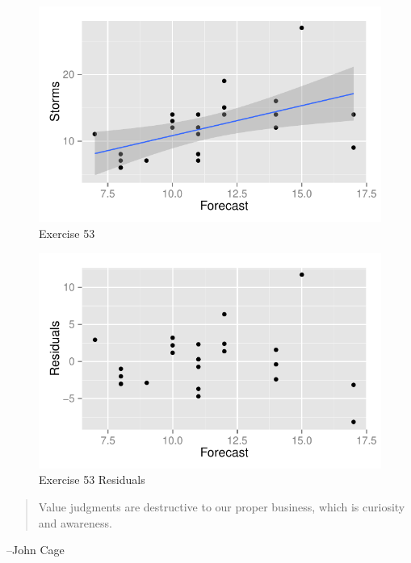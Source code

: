 \documentclass[letterpaper, landscape]{exam}
\begin{document}
\begin{description}
        \begin{figure}[H]
          \centering
          \includegraphics[scale = 0.9]{figures/ex53_forecast.pdf}
          \caption{Exercise 53}
        \end{figure}

        \begin{figure}[H]
          \centering
          \includegraphics[scale = 0.9]{figures/ex53_residuals.pdf}
          \caption{Exercise 53 Residuals}
        \end{figure}

    \end{description}

  \else
    \vspace{12 cm}
    \begin{quote}
      \begin{em}
        Value judgments are destructive to our proper business, which is
        curiosity and awareness. 
      \end{em}
    \end{quote}
    \hspace{1 cm} --John Cage
  \fi
\end{document}

